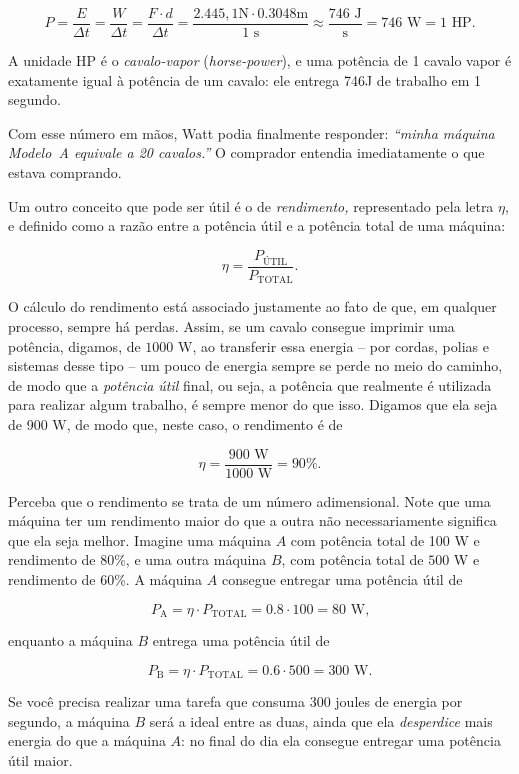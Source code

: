 $$ P = \dfrac{E}{\Delta t} = \dfrac{W}{\Delta t} = \dfrac{F \cdot d}{\Delta t} =  \dfrac{2.445,1 \text{N} \cdot 0.3048 \text{m}}{1 \text{ s}} \approx \dfrac{746\text{ J}}{\text{s}} = \boxed{746 \text{ W} = 1 \text{ HP.}} $$



A unidade HP é o \emph{cavalo-vapor} (\emph{horse-power}), e uma potência de 1 cavalo vapor é exatamente igual à potência de um cavalo: ele entrega 746J de trabalho em 1 segundo.

Com esse número em mãos, Watt podia finalmente responder: \textit{``minha máquina Modelo~A equivale a 20 cavalos.''} O comprador entendia imediatamente o que estava comprando.

Um outro conceito que pode ser útil é o de \emph{rendimento,} representado pela letra $\eta$, e definido como a razão entre a potência útil e a potência total de uma máquina:

$$ \boxed{\eta = \dfrac{P_\text{ÚTIL}}{P_\text{TOTAL}}.}$$

O cálculo do rendimento está associado justamente ao fato de que, em qualquer processo, sempre há perdas. Assim, se um cavalo consegue imprimir uma potência, digamos, de $1000$ W, ao transferir essa energia -- por cordas, polias e sistemas desse tipo -- um pouco de energia sempre se perde no meio do caminho, de modo que a \emph{potência útil} final, ou seja, a potência que realmente é utilizada para realizar algum trabalho, é sempre menor do que isso. Digamos que ela seja de 900 W, de modo que, neste caso, o rendimento é de

$$ \eta = \dfrac{900\text{ W}}{1000 \text{ W}} = 90 \%.$$

Perceba que o rendimento se trata de um número adimensional. Note que uma máquina ter um rendimento maior do que a outra não necessariamente significa que ela seja melhor. Imagine uma máquina $A$ com potência total de 100 W e rendimento de 80\%, e uma outra máquina $B$, com potência total de $500 $ W e rendimento de 60\%. A máquina $A$ consegue entregar uma potência útil de 

$$ P_\text{A} = \eta \cdot P_\text{TOTAL} = 0.8 \cdot 100 = 80 \text{ W,}$$

\noindent enquanto a máquina $B$ entrega uma potência útil de

$$ P_\text{B} = \eta \cdot P_\text{TOTAL} = 0.6 \cdot 500 = 300 \text{ W.}$$

Se você precisa realizar uma tarefa que consuma 300 joules de energia por segundo, a máquina $B$ será a ideal entre as duas, ainda que ela \emph{desperdice} mais energia do que a máquina $A$: no final do dia ela consegue entregar uma potência útil maior.


